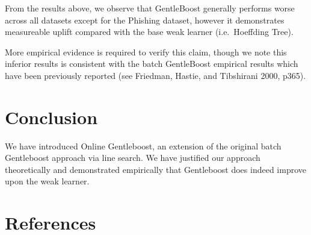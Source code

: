 \documentclass[
]{article}
\begin{document}
From the results above, we observe that GentleBoost generally performs
worse across all datasets except for the Phishing dataset, however it
demonstrates measureable uplift compared with the base weak learner
(i.e.~Hoeffding Tree).

More empirical evidence is required to verify this claim, though we note
this inferior results is consistent with the batch GentleBoost empirical
results which have been previously reported (see Friedman, Hastie, and
Tibshirani 2000, p365).

\hypertarget{conclusion}{%
\section{Conclusion}\label{conclusion}}

We have introduced Online Gentleboost, an extension of the original
batch Gentleboost approach via line search. We have justified our
approach theoretically and demonstrated empirically that Gentleboost
does indeed improve upon the weak learner.

\hypertarget{references}{%
\section*{References}\label{references}}
\end{document}
